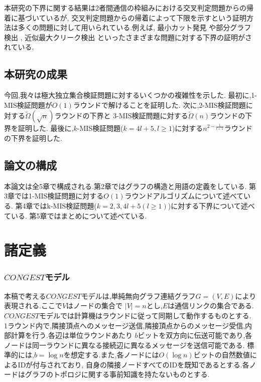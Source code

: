 \documentclass[12pt]{thesis}
\theoremstyle{definition}
\begin{document}
本研究の下界に関する結果は2者間通信の枠組みにおける交叉判定問題からの帰着に基づいているが,
交叉判定問題からの帰着によって下限を示すという証明方法は多くの問題に対して用いられている.例えば,
最小カット発見 \cite{ghaffari2013distributed} や部分グラフ検出 \cite{fischer2018possibilities} ,
近似最大クリーク検出 \cite{czumaj2020detecting} といったさまざまな問題に対する下界の証明がされている.

\section{本研究の成果}
今回,我々は極大独立集合検証問題に対するいくつかの複雑性を示した.
最初に,1-MIS検証問題が$O(1)$ラウンドで解けることを証明した.
次に,2-MIS検証問題に対する$\tilde{\Omega} (\sqrt{n})$ラウンドの下界と
3-MIS検証問題に対する$\tilde{\Omega} (n)$ラウンドの下界を証明した.
最後に,$k$-MIS検証問題($k = 4l + 5, l \geq 1$)に対する$n^{2 - \frac{1}{l + 1}}$ラウンドの下界を証明した.

\section{論文の構成}
本論文は全5章で構成される.第2章ではグラフの構造と用語の定義をしている.
第3章では1-MIS検証問題に対する$O(1)$ラウンドアルゴリズムについて述べている.
第4章ではk-MIS検証問題($k = 2, 3, 4l + 5( l \geq 1)$)に対する下界について述べている.
第5章ではまとめについて述べている.

\chapter{諸定義}

\subsection*{$CONGEST$モデル}
本稿で考える$CONGEST$モデルは,単純無向グラフ連結グラフ$G = (V, E)$により表現される.ここで$V$はノードの集合で
$|V| = n$とし,$E$は通信リンクの集合である.$CONGEST$モデルでは計算機はラウンドに従って同期して動作するものとする.
1ラウンド内で,隣接頂点へのメッセージ送信,隣接頂点からのメッセージ受信,内部計算を行う.各辺は単位ラウンドあたり
$b$ビットを双方向に伝送可能であり,各ノードは同一ラウンドに異なる接続辺に異なるメッセージを送信可能である.
標準的には,$b = \log n$を想定する.また,各ノードには$O(\log n)$ビットの自然数値によるIDが付与されており,
自身の隣接ノードすべてのIDを既知であるとする.各ノードはグラフのトポロジに関する事前知識を持たないものとする.
\end{document}
